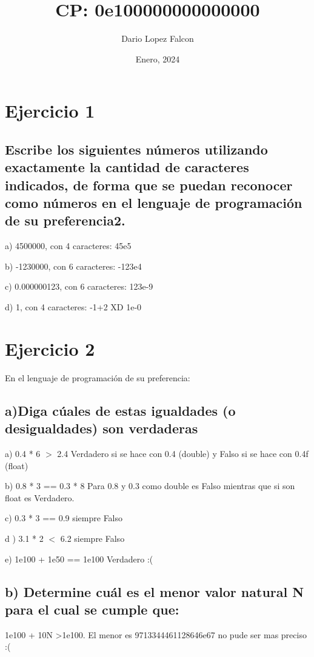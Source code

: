 \documentclass[a4paper,12pt]{article}
\begin{document}
\title{CP: 0e100000000000000}
\author{Dario Lopez Falcon}
\date{Enero, 2024}
\maketitle

\section{Ejercicio 1}
\subsection*{Escribe los siguientes números utilizando exactamente la cantidad de caracteres indicados, de
forma que se puedan reconocer como números en el lenguaje de programación de su preferencia2.}

a) 4500000, con 4 caracteres: 45e5

b) -1230000, con 6 caracteres: -123e4

c) 0.000000123, con 6 caracteres: 123e-9

d) 1, con 4 caracteres: -1+2 XD 1e-0

\section*{Ejercicio 2}
En el lenguaje de programación de su preferencia:

\subsection*{ a)Diga cúales de estas igualdades (o desigualdades) son verdaderas}

a) 0.4 * 6 $>$ 2.4 Verdadero si se hace con 0.4 (double) y Falso si se hace con 0.4f (float)


b) 0.8 * 3 == 0.3 * 8  Para 0.8 y 0.3 como double es Falso mientras que si son float es Verdadero.

c) 0.3 * 3 == 0.9 siempre Falso

d ) 3.1 * 2  $<$ 6.2 siempre Falso

e) 1e100 + 1e50 == 1e100 Verdadero :(

\subsection*{ b) Determine cuál es el menor valor natural N para el cual se cumple que:}
1e100 + 10N >1e100.  El menor es 9713344461128646e67 no pude ser mas preciso :(
\end{document}
